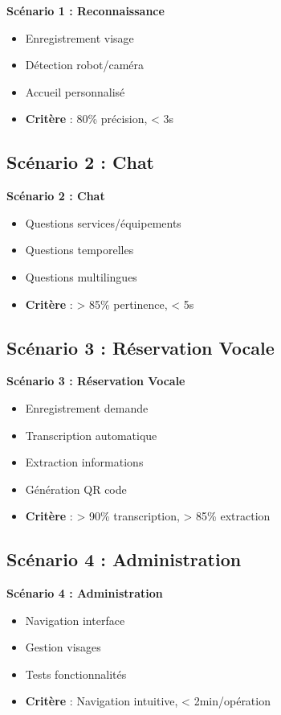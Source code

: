 \documentclass[12pt,a4paper]{article}
\newenvironment{block}[1]{\begin{center}\begin{minipage}{0.9\textwidth}\textbf{#1}\\}{\end{minipage}\end{center}}
\begin{document}
\begin{block}{Scénario 1 : Reconnaissance}
\begin{itemize}
    \item Enregistrement visage
    \item Détection robot/caméra
    \item Accueil personnalisé
    \item \textbf{Critère} : 80\% précision, < 3s
\end{itemize}
\end{block}

\subsection{Scénario 2 : Chat}

\begin{block}{Scénario 2 : Chat}
\begin{itemize}
    \item Questions services/équipements
    \item Questions temporelles
    \item Questions multilingues
    \item \textbf{Critère} : > 85\% pertinence, < 5s
\end{itemize}
\end{block}

\subsection{Scénario 3 : Réservation Vocale}

\begin{block}{Scénario 3 : Réservation Vocale}
\begin{itemize}
    \item Enregistrement demande
    \item Transcription automatique
    \item Extraction informations
    \item Génération QR code
    \item \textbf{Critère} : > 90\% transcription, > 85\% extraction
\end{itemize}
\end{block}

\subsection{Scénario 4 : Administration}

\begin{block}{Scénario 4 : Administration}
\begin{itemize}
    \item Navigation interface
    \item Gestion visages
    \item Tests fonctionnalités
    \item \textbf{Critère} : Navigation intuitive, < 2min/opération
\end{itemize}
\end{block}
\end{document}
